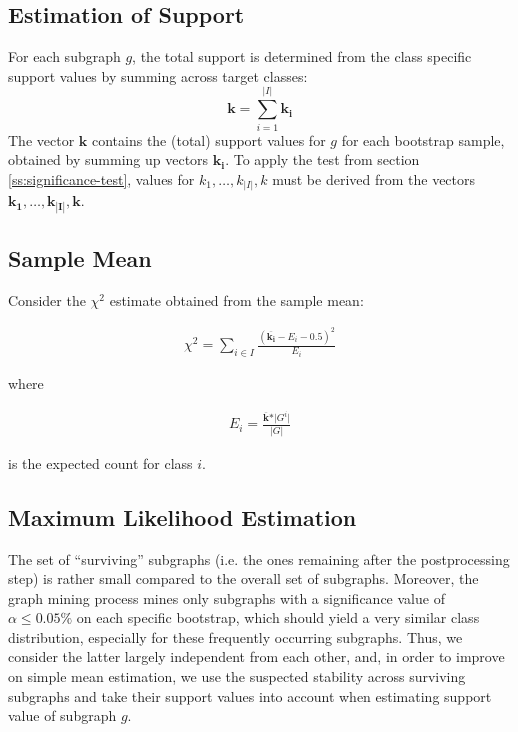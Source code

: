 \documentclass{article}
\begin{document}
\subsection{Estimation of Support}
For each subgraph $g$, the total support is determined from the class specific
support values by summing across target classes:
\begin{equation}
  \mathbf{k}=\sum_{i=1}^{\vert I\vert} \mathbf{k_i}
  \label{eqn:total-support}
\end{equation}
The vector $\mathbf{k}$ contains the (total) support values for $g$ for each
bootstrap sample, obtained by summing up vectors $\mathbf{k_i}$.  To apply the
test from section \ref{ss:significance-test}, values for $k_1, \ldots,k_{|I|},k$ 
must be derived from the vectors
$\mathbf{k_1},\ldots,\mathbf{k_{|I|}}, \mathbf{k}$.

\subsection{Sample Mean}
\label{ss:simple-mean}

Consider the $\chi^2$ estimate obtained from the sample mean:

\begin{align}
  \chi^2 = \sum_{i \in I} \frac{(\overline{\mathbf{k_i}}-E_i-0.5)^2}{E_i} 
  \label{align:meanX2}
\end{align}

where 

\begin{align}
  E_i=\frac{\overline{\mathbf{k}}*\vert G^i\vert}{\vert G \vert}
\end{align}

is the expected count for class $i$.

\subsection{Maximum Likelihood Estimation}
\label{ss:MLE}

The set of ``surviving'' subgraphs (i.e. the ones remaining after the
postprocessing step) is rather small compared to the overall set of subgraphs.
Moreover, the graph mining process mines only subgraphs with a significance
value of $\alpha \le 0.05\%$ on each specific bootstrap, which should yield a very similar
class distribution, especially for these frequently occurring subgraphs.  Thus,
we consider the latter largely independent from each other, and, in order to
improve on simple mean estimation, we use the suspected stability across
surviving subgraphs and take their support values into account when estimating
support value of subgraph $g$. 
\end{document}
